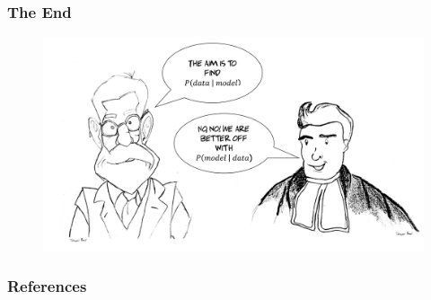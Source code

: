 \documentclass[handout]{beamer}\usepackage[]{graphicx}\usepackage[]{color}
\begin{document}
\begin{frame}
\frametitle{The End}

\begin{figure}
\includegraphics[scale=0.4]{pic1.JPG}
\end{figure}

\end{frame}

\begin{frame}[allowframebreaks]
\frametitle{References}
\printbibliography

\end{frame}
\end{document}
